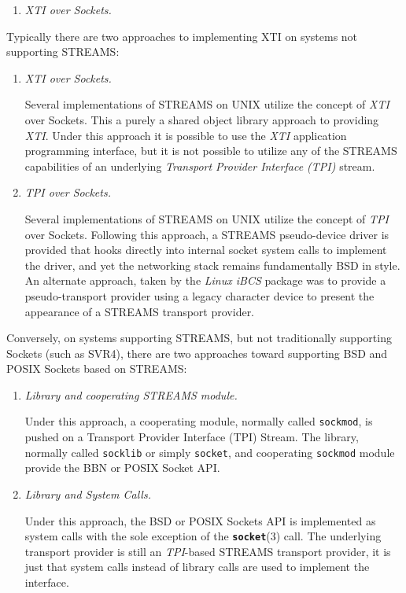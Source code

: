 \documentclass[letterpaper,final,notitlepage,twocolumn,10pt,twoside]{article}
\begin{document}
\begin{enumerate}
\item {\it XTI over Sockets.}
\end{enumerate}

Typically there are two approaches to implementing XTI on systems not
supporting STREAMS:

\begin{enumerate}

\item {\it XTI over Sockets.}

Several implementations of STREAMS on UNIX utilize the concept of \textsl{XTI}
over Sockets.  This a purely a shared object library approach to providing
\textsl{XTI}.  Under this approach it is possible to use the \textsl{XTI}
application programming interface, but it is not possible to utilize any of
the STREAMS capabilities of an underlying \textit{Transport Provider Interface
(TPI)} stream.

\item {\it TPI over Sockets.}

Several implementations of STREAMS on UNIX utilize the concept of \textsl{TPI}
over Sockets.  Following this approach, a STREAMS pseudo-device driver is
provided that hooks directly into internal socket system calls to implement
the driver, and yet the networking stack remains fundamentally BSD in style.
An alternate approach, taken by the \textsl{Linux iBCS} package was to provide
a pseudo-transport provider using a legacy character device to present the
appearance of a STREAMS transport provider.

\end{enumerate}

Conversely, on systems supporting STREAMS, but not traditionally supporting
Sockets (such as SVR4), there are two approaches toward supporting BSD and
POSIX Sockets based on STREAMS:

\begin{enumerate}

\item {\it Library and cooperating \sl STREAMS module.}

Under this approach, a cooperating module, normally called \texttt{sockmod},
is pushed on a Transport Provider Interface (TPI) Stream.  The library,
normally called \texttt{socklib} or simply \texttt{socket}, and cooperating
\texttt{sockmod} module provide the BBN or POSIX Socket API.  \cite[]{impbsd}
\cite[]{socklib}

\item {\it Library and System Calls.}

Under this approach, the BSD or POSIX Sockets API is implemented as system
calls with the sole exception of the \textbf{\texttt{socket}}(3) call.  The
underlying transport provider is still an \textsl{TPI}-based STREAMS transport
provider, it is just that system calls instead of library calls are used to
implement the interface.  \cite[]{socklib}

\end{enumerate}
\end{document}
